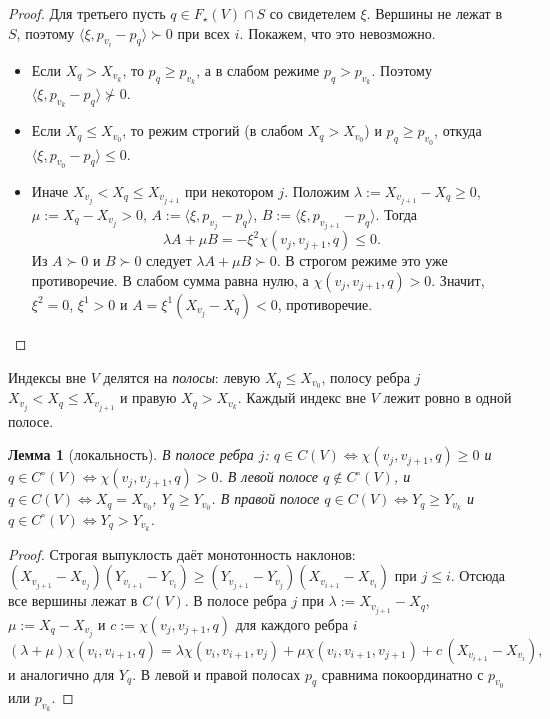 \documentclass[a4paper,11pt]{article}
\theoremstyle{plain}
\newtheorem{lemma}[theorem]{Лемма}
\theoremstyle{definition}
\theoremstyle{remark}
\newcommand{\ip}[2]{\langle #1, #2\rangle}
\newcommand{\gs}{\mathrel{\succ}}
\newcommand{\ngs}{\mathrel{\not\succ}}
\begin{document}
\begin{proof}
    Для третьего пусть $q\in F_\star(V)\cap S$ со свидетелем $\xi$. Вершины не лежат в $S$, поэтому $\ip{\xi}{p_{v_i}-p_q}\gs0$ при всех $i$. Покажем, что это невозможно.
    \begin{itemize}
        \item Если $X_q>X_{v_k}$, то $p_q\ge p_{v_k}$, а в слабом режиме $p_q>p_{v_k}$. Поэтому $\ip{\xi}{p_{v_k}-p_q}\ngs0$.
        \item Если $X_q\le X_{v_0}$, то режим строгий (в слабом $X_q>X_{v_0}$) и $p_q\ge p_{v_0}$, откуда $\ip{\xi}{p_{v_0}-p_q}\le0$.
        \item Иначе $X_{v_j}<X_q\le X_{v_{j+1}}$ при некотором $j$. Положим $\lambda:=X_{v_{j+1}}-X_q\ge0$, $\mu:=X_q-X_{v_j}>0$, $A:=\ip{\xi}{p_{v_j}-p_q}$, $B:=\ip{\xi}{p_{v_{j+1}}-p_q}$. Тогда
        \[
            \lambda A+\mu B=-\xi^2\chi(v_j,v_{j+1},q)\le0.
        \]
        Из $A\gs0$ и $B\gs0$ следует $\lambda A+\mu B\gs0$. В строгом режиме это уже противоречие. В слабом сумма равна нулю, а $\chi(v_j,v_{j+1},q)>0$. Значит, $\xi^2=0$, $\xi^1>0$ и $A=\xi^1(X_{v_j}-X_q)<0$, противоречие.
    \end{itemize}
\end{proof}

Индексы вне $V$ делятся на \emph{полосы}: левую $X_q\le X_{v_0}$, полосу ребра $j$ $X_{v_j}<X_q\le X_{v_{j+1}}$ и правую $X_q>X_{v_k}$. Каждый индекс вне $V$ лежит ровно в одной полосе.

\begin{lemma}[локальность]\label{lem:local}
    В полосе ребра $j$: $q\in C(V)\iff\chi(v_j,v_{j+1},q)\ge0$ и $q\in C^\circ(V)\iff\chi(v_j,v_{j+1},q)>0$. В левой полосе $q\notin C^\circ(V)$, и $q\in C(V)\iff X_q=X_{v_0}$, $Y_q\ge Y_{v_0}$. В правой полосе $q\in C(V)\iff Y_q\ge Y_{v_k}$ и $q\in C^\circ(V)\iff Y_q>Y_{v_k}$.
\end{lemma}

\begin{proof}
    Строгая выпуклость даёт монотонность наклонов: $(X_{v_{j+1}}-X_{v_j})(Y_{v_{i+1}}-Y_{v_i})\ge(Y_{v_{j+1}}-Y_{v_j})(X_{v_{i+1}}-X_{v_i})$ при $j\le i$. Отсюда все вершины лежат в $C(V)$. В полосе ребра $j$ при $\lambda:=X_{v_{j+1}}-X_q$, $\mu:=X_q-X_{v_j}$ и $c:=\chi(v_j,v_{j+1},q)$ для каждого ребра $i$
    \[
        (\lambda+\mu)\chi(v_i,v_{i+1},q)=\lambda\chi(v_i,v_{i+1},v_j)+\mu\chi(v_i,v_{i+1},v_{j+1})+c\,(X_{v_{i+1}}-X_{v_i}),
    \]
    и аналогично для $Y_q$. В левой и правой полосах $p_q$ сравнима покоординатно с $p_{v_0}$ или $p_{v_k}$.
\end{proof}
\end{document}
